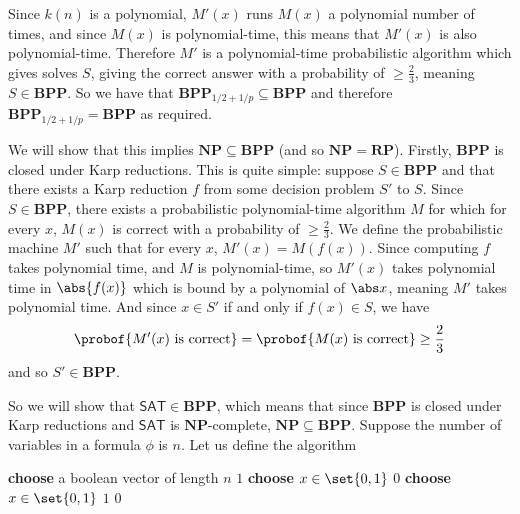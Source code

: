 \documentclass[10pt]{article}
\def\sat{\mathsf{SAT}}
\def\NP{\mathbf{NP}}
\def\BPP{\mathbf{BPP}}
\def\RP{\mathbf{RP}}
\begin{document}
    Since $k(n)$ is a polynomial, $M'(x)$ runs $M(x)$ a polynomial number of times, and since $M(x)$ is polynomial-time, this means that $M'(x)$ is also polynomial-time.
    Therefore $M'$ is a polynomial-time probabilistic algorithm which gives solves $S$, giving the correct answer with a probability of $\geq\frac23$, meaning $S\in\BPP$.
    So we have that $\BPP_{1/2+1/p}\subseteq\BPP$ and therefore $\BPP_{1/2+1/p}=\BPP$ as required.

    \item We will show that this implies $\NP\subseteq\BPP$ (and so $\NP=\RP$).
    Firstly, $\BPP$ is closed under Karp reductions.
    This is quite simple: suppose $S\in\BPP$ and that there exists a Karp reduction $f$ from some decision problem $S'$ to $S$.
    Since $S\in\BPP$, there exists a probabilistic polynomial-time algorithm $M$ for which for every $x$, $M(x)$ is correct with a probability of $\geq\frac23$.
    We define the probabilistic machine $M'$ such that for every $x$, $M'(x)=M(f(x))$.
    Since computing $f$ takes polynomial time, and $M$ is polynomial-time, so $M'(x)$ takes polynomial time in $\abs{f(x)}$ which is bound by a polynomial of $\abs x$, meaning $M'$ takes polynomial time.
    And since $x\in S'$ if and only if $f(x)\in S$, we have
    \[ \probof{M'(x)\text{ is correct}} = \probof{M(x)\text{ is correct}} \geq \frac23 \]
    and so $S'\in\BPP$.

    So we will show that $\sat\in\BPP$, which means that since $\BPP$ is closed under Karp reductions and $\sat$ is $\NP$-complete, $\NP\subseteq\BPP$.
    Suppose the number of variables in a formula $\phi$ is $n$.
    Let us define the algorithm

    \algorithm
            \State\textbf{choose} a boolean vector of length $n$
             \Return $1$
            \cr\noalign{\kern5pt}
            \State\textbf{choose} $x\in\set{0,1}$
             \Return $0$
                \State\textbf{choose} $x\in\set{0,1}$
                 \Return $1$
            \EndRepeat
            \State\Return $0$
        \EndFunc
    \ealgorithm
\end{document}
